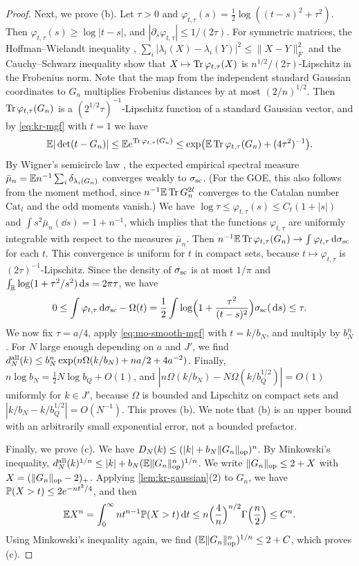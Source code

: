 \begin{proof}
Next, we prove (b). Let $\tau>0$ and $\varphi_{t,\tau}(s)=\frac12\log((t-s)^2+\tau^2)$. Then $\varphi_{t,\tau}(s)\ge\log|t-s|$, and $|\partial_s\varphi_{t,\tau}|\le1/(2\tau)$. For symmetric matrices, the Hoffman--Wielandt inequality \cite[Lemma~2.1.19]{AndersonGuionnetZeitouni2010}, $\sum_i|\lambda_i(X)-\lambda_i(Y)|^2\le\|X-Y\|_F^2$ and the Cauchy--Schwarz inequality show that $X\mapsto\operatorname{Tr}\varphi_{t,\tau}(X)$ is $n^{1/2}/(2\tau)$-Lipschitz in the Frobenius norm. Note that the map from the independent standard Gaussian coordinates to $G_n$ multiplies Frobenius distances by at most $(2/n)^{1/2}$. Then $\operatorname{Tr}\varphi_{t,\tau}(G_n)$ is a $(2^{1/2}\tau)^{-1}$-Lipschitz function of a standard Gaussian vector, and by \eqref{eq:kr-mgf} with $t=1$ we have
\begin{equation}\label{eq:mo-smooth-mgf}
\mathbb E|\det(t-G_n)|\le\mathbb E e^{\operatorname{Tr}\varphi_{t,\tau}(G_n)}\le\exp\bigl(\mathbb E\operatorname{Tr}\varphi_{t,\tau}(G_n)+(4\tau^2)^{-1}\bigr).
\end{equation}
By Wigner's semicircle law \cite[Theorem~2.1.1]{AndersonGuionnetZeitouni2010}, the expected empirical spectral measure $\bar\mu_n=\mathbb E n^{-1}\sum_i\delta_{\lambda_i(G_n)}$ converges weakly to $\sigma_{\rm sc}$. (For the GOE, this also follows from the moment method, since $n^{-1}\mathbb E\operatorname{Tr} G_n^{2l}$ converges to the Catalan number $\mathrm{Cat}_l$ and the odd moments vanish.) We have $\log\tau\le\varphi_{t,\tau}(s)\le C_t(1+|s|)$ and $\int s^2\bar\mu_n(\dd s)=1+n^{-1}$, which implies that the functions $\varphi_{t,\tau}$ are uniformly integrable with respect to the measures $\bar\mu_n$. Then $n^{-1}\mathbb E\operatorname{Tr}\varphi_{t,\tau}(G_n)\to\int\varphi_{t,\tau}\,\mathrm d\sigma_{\rm sc}$ for each $t$. This convergence is uniform for $t$ in compact sets, because $t\mapsto\varphi_{t,\tau}$ is $(2\tau)^{-1}$-Lipschitz. Since the density of $\sigma_{\rm sc}$ is at most $1/\pi$ and $\int_\mathbb R\log(1+\tau^2/s^2)\,\mathrm d s=2\pi\tau$, we have
\[
0\le\int\varphi_{t,\tau}\,\mathrm d\sigma_{\rm sc}-\Omega(t)=\frac12\int\log\Bigl(1+\frac{\tau^2}{(t-s)^2}\Bigr)\sigma_{\rm sc}(\,\mathrm d s)\le\tau.
\]
We now fix $\tau=a/4$, apply \eqref{eq:mo-smooth-mgf} with $t=k/b_N$, and multiply by $b_N^n$. For $N$ large enough depending on $a$ and $J'$, we find $d_N^{\rm all}(k)\le b_N^n\exp(n\Omega(k/b_N)+na/2+4a^{-2})$. Finally, $n\log b_N=\frac12N\log b_Q+O(1)$, and $|n\Omega(k/b_N)-N\Omega(k/b_Q^{1/2})|=O(1)$ uniformly for $k\in J'$, because $\Omega$ is bounded and Lipschitz on compact sets and $|k/b_N-k/b_Q^{1/2}|=O(N^{-1})$. This proves (b). We note that (b) is an upper bound with an arbitrarily small exponential error, not a bounded prefactor.

Finally, we prove (c). We have $D_N(k)\le(|k|+b_N\|G_n\|_{\rm op})^n$. By Minkowski's inequality, $d_N^{\rm all}(k)^{1/n}\le|k|+b_N(\mathbb E\|G_n\|_{\rm op}^n)^{1/n}$. We write $\|G_n\|_{\rm op}\le2+X$ with $X=(\|G_n\|_{\rm op}-2)_+$. Applying \cref{lem:kr-gaussian}(2) to $G_n$, we have $\mathbb P(X>t)\le2e^{-nt^2/4}$, and then
\[
\mathbb E X^n=\int_0^\infty nt^{n-1}\mathbb P(X>t)\,\mathrm d t\le n\Bigl(\frac4n\Bigr)^{n/2}\Gamma\Bigl(\frac n2\Bigr)\le C^n.
\]
Using Minkowski's inequality again, we find $(\mathbb E\|G_n\|_{\rm op}^n)^{1/n}\le2+C$, which proves (c).
\end{proof}


